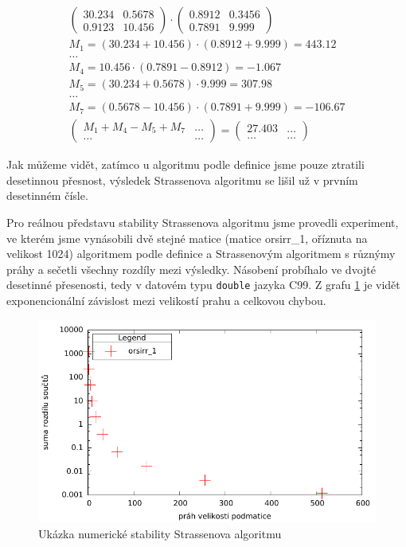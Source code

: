 \begin{align}
\begin{pmatrix}
 30.234 & 0.5678 \\
 0.9123 & 10.456
\end{pmatrix} \cdot \begin{pmatrix}
 0.8912 & 0.3456 \\
 0.7891 & 9.999
\end{pmatrix} \\
M_{1} = (30.234 + 10.456) \cdot (0.8912 + 9.999) = 443.12  \\
\hdots \\
M_{4} = 10.456 \cdot (0.7891 - 0.8912) = -1.067 \\
M_{5} = (30.234 + 0.5678) \cdot 9.999 = 307.98 \\
\hdots \\
M_{7} = (0.5678 - 10.456) \cdot (0.7891 + 9.999) = -106.67 \\
 \begin{pmatrix}
 M_{1} + M_{4} - M_{5} + M_{7} & \hdots \\
 \hdots & \hdots
\end{pmatrix} = \begin{pmatrix}
 27.403 & \hdots \\
 \hdots & \hdots
\end{pmatrix}
\end{align}


Jak můžeme vidět, zatímco u algoritmu podle definice jsme pouze ztratili desetinnou přesnost, výsledek Strassenova algoritmu se lišil už v prvním desetinném čísle. 

Pro reálnou představu stability Strassenova algoritmu jsme provedli experiment, ve kterém jsme vynásobili dvě stejné matice (matice orsirr\_1, oříznuta na velikost 1024) algoritmem podle definice a Strassenovým algoritmem s různýmy práhy a sečetli všechny rozdíly mezi výsledky. Násobení probíhalo ve dvojté desetinné přesenosti, tedy v datovém typu \texttt{double} jazyka C99. Z grafu \ref{fig:StrassenStability} je vidět exponencionální závislost mezi velikostí prahu a celkovou chybou.

\begin{figure}[H]\centering
	\includegraphics[width=\textwidth]{./images/strassen_stability}
	\caption{Ukázka numerické stability Strassenova algoritmu}
	\label{fig:StrassenStability}
\end{figure}


